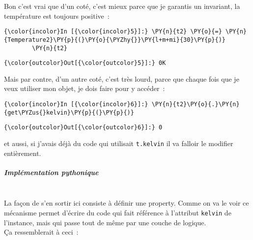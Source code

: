     Bon c'est vrai que d'un coté, c'est mieux parce que je garantis un
invariant, la température est toujours positive~:

    \begin{Verbatim}[commandchars=\\\{\}]
{\color{incolor}In [{\color{incolor}5}]:} \PY{n}{t2} \PY{o}{=} \PY{n}{Temperature2}\PY{p}{(}\PY{o}{\PYZhy{}}\PY{l+m+mi}{30}\PY{p}{)}
        \PY{n}{t2}
\end{Verbatim}


\begin{Verbatim}[commandchars=\\\{\}]
{\color{outcolor}Out[{\color{outcolor}5}]:} 0K
\end{Verbatim}
            
    Mais par contre, d'un autre coté, c'est très lourd, parce que chaque
fois que je veux utiliser mon objet, je dois faire pour y accéder~:

    \begin{Verbatim}[commandchars=\\\{\}]
{\color{incolor}In [{\color{incolor}6}]:} \PY{n}{t2}\PY{o}{.}\PY{n}{get\PYZus{}kelvin}\PY{p}{(}\PY{p}{)}
\end{Verbatim}


\begin{Verbatim}[commandchars=\\\{\}]
{\color{outcolor}Out[{\color{outcolor}6}]:} 0
\end{Verbatim}
            
    et aussi, si j'avais déjà du code qui utilisait \texttt{t.kelvin} il va
falloir le modifier entièrement.

    \hypertarget{impluxe9mentation-pythonique}{%
\subparagraph{Implémentation
pythonique\\\\}\label{impluxe9mentation-pythonique}}

    La façon de s'en sortir ici consiste à définir une property. Comme on va
le voir ce mécanisme permet d'écrire du code qui fait référence à
l'attribut \texttt{kelvin} de l'instance, mais qui passe tout de même
par une couche de logique.\\

Ça ressemblerait à ceci~:

